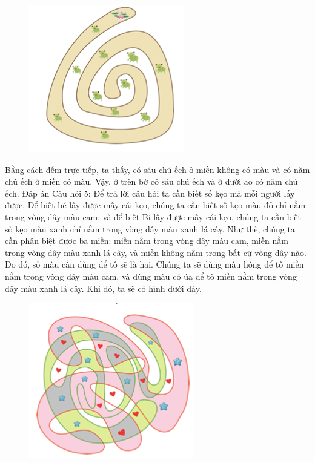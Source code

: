 \begin{figure}[H]
	\centering
	\vspace*{-5pt}
	\captionsetup{labelformat= empty, justification=centering}
	\includegraphics[width=0.4\linewidth]{1}
	\vspace*{-15pt}
\end{figure}
Bằng cách đếm trực tiếp, ta thấy, có sáu chú ếch ở miền không có màu và có năm chú ếch ở miền có màu. Vậy, ở trên bờ có sáu chú ếch và ở dưới ao có năm chú ếch. 
\vskip 0.1cm
Đáp án Câu hỏi $5$:
\vskip 0.1cm
Để trả lời câu hỏi ta cần biết số kẹo mà mỗi người lấy được. Để biết bé lấy được mấy cái kẹo, chúng ta cần biết số kẹo màu đỏ chỉ nằm trong vòng dây màu cam; và để biết Bi lấy được mấy cái kẹo, chúng ta cần biết số kẹo màu xanh chỉ nằm trong vòng dây màu xanh lá cây. 
\vskip 0.1cm
Như thế, chúng ta cần phân biệt được ba miền: miền nằm trong vòng dây màu cam, miền nằm trong vòng dây màu xanh lá cây, và miền không nằm trong bất cứ vòng dây nào. Do đó, số màu cần dùng để tô sẽ là hai. Chúng ta sẽ dùng màu hồng để tô miền nằm trong vòng dây màu cam, và dùng màu cỏ úa để tô miền nằm trong vòng dây màu xanh lá cây. Khi đó, ta sẽ có hình dưới đây. 
\begin{figure}[H]
	\centering
	\vspace*{-5pt}
	\captionsetup{labelformat= empty, justification=centering}
	\includegraphics[width=0.4\linewidth]{2}
	\vspace*{-15pt}
\end{figure}
